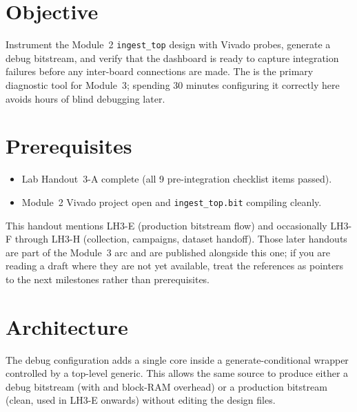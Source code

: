 \documentclass[11pt,letterpaper]{article}
\begin{document}

\section{Objective}
Instrument the Module~2 \texttt{ingest\_top} design with Vivado \ILA{} probes, generate a debug bitstream, and verify that the \ILA{} dashboard is ready to capture integration failures before any inter-board connections are made. The \ILA{} is the primary diagnostic tool for Module~3; spending 30 minutes configuring it correctly here avoids hours of blind debugging later.

\section{Prerequisites}
\begin{itemize}[leftmargin=2em]
	\item Lab Handout~3-A complete (all 9 pre-integration checklist items passed).
	\item Module~2 Vivado project open and \texttt{ingest\_top.bit} compiling cleanly.
\end{itemize}

\begin{tcolorbox}[infobox={Forward References}]
This handout mentions LH3-E (production bitstream flow) and occasionally LH3-F through LH3-H (collection, campaigns, dataset handoff). Those later handouts are part of the Module~3 arc and are published alongside this one; if you are reading a draft where they are not yet available, treat the references as pointers to the next milestones rather than prerequisites.
\end{tcolorbox}

\section{Architecture}
The debug configuration adds a single \ILA{} core inside a generate-conditional wrapper controlled by a top-level generic. This allows the same \RTL{} source to produce either a debug bitstream (with \ILA{} and block-\mbox{RAM} overhead) or a production bitstream (clean, used in LH3-E onwards) without editing the design files.

\end{document}
